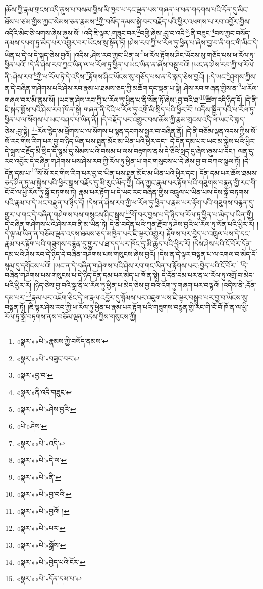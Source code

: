 །ཆོས་ཀྱི་རྣམ་གྲངས་འདི་ནུས་པ་བསམ་གྱིས་མི་ཁྱབ་པ་དང་ལྡན་པས་གཞན་ལ་ཕན་གདགས་པའི་དོན་དུ་མིང་ཐོས་པ་ཙམ་གྱིས་ཀྱང་སེམས་ཅན་རྣམས་\footnote{«སྣར་»«པེ་»རྣམས་ཀྱི་བསོད་ནམས་}ཀྱི་བསོད་ནམས་སྐྱེ་བར་བརྗོད་པའི་ཕྱིར་འཕགས་པ་རབ་འབྱོར་གྱིས་འདིའི་མིང་ཅི་ལགས་ཞེས་ཞུས་སོ། །འདི་ཇི་ལྟར་:གཟུང་བར་\footnote{«སྣར་»«པེ་»བཟུང་བར་}བགྱི་ཞེས་:བྱ་བ་འདི་\footnote{«སྣར་»བྱ་བ་}:ནི་བཟུང་\footnote{«སྣར་»ནི་འདི་གཟུང་}བས་ཀྱང་བསོད་ནམས་དཔག་ཏུ་མེད་པར་འགྱུར་བར་ཡོངས་སུ་སྟོན་ཏོ། །ཤེས་རབ་ཀྱི་ཕ་རོལ་ཏུ་ཕྱིན་པ་ཞེས་བྱ་བ་ནི་གང་གི་མིང་དེ་ཡིན་པ་དེ་ལ་དེ་སྐད་ཅེས་བྱའོ། །འདིས་:ཤེས་རབ་ཀྱང་ཡིན་ལ་\footnote{«སྣར་»«པེ་»ཤེས་བྱའི་}ཕ་རོལ་རྟོགས་ཤིང་ཡོངས་སུ་གཅོད་པས་ཕ་རོལ་ཏུ་ཕྱིན་པའོ། །དེ་ནི་ཤེས་རབ་ཀྱང་ཡིན་ལ་ཕ་རོལ་ཏུ་ཕྱིན་པ་ཡང་ཡིན་ན་ཞེས་བསྡུ་བའོ། །ཡང་ན་ཤེས་རབ་ཀྱི་ཕ་རོལ་ནི་:ཤེས་རབ་\footnote{«པེ་»ཤེས་}ཀྱི་ཕ་རོལ་ཏེ་དེ་འདིས་\footnote{«སྣར་»«པེ་»འདི་}རྟོགས་ཤིང་ཡོངས་སུ་གཅོད་པས་ན་དེ་སྐད་ཅེས་བྱའོ། །:དེ་ཡང་\footnote{«སྣར་»«པེ་»དེ་ལ་}ཤུགས་ཀྱིས་ན་དེ་བཞིན་གཤེགས་པའི་ཤེས་རབ་རྣམ་པ་ཐམས་ཅད་ཀྱི་མཆོག་དང་ལྡན་པ་སྟེ། ཤེས་རབ་གཞན་གྱིས་ན་\footnote{«སྣར་»«པེ་»ནི་}ཕ་རོལ་གཞལ་བར་མི་ནུས་སོ། །ཡང་ན་ཤེས་རབ་ཀྱི་ཕ་རོལ་ཏུ་ཕྱིན་པ་ནི་སོན་ཏོ་ཞེས་:བྱ་བའི་ཐ་\footnote{«སྣར་»«པེ་»བྱ་བའི་}ཚིག་འདི་ཉིད་དོ། །དེ་ནི་ཇི་སྐད་སྨོས་པའི་ཤེས་རབ་ཁོ་ན་སྟེ། གཞན་ནི་དེའི་ཕ་རོལ་ཏུ་འགྲོ་མི་སྲིད་པའི་ཕྱིར་རོ། །འདིས་སྦྱིན་པའི་ཕ་རོལ་ཏུ་ཕྱིན་པ་ལ་སོགས་པ་ཡང་བཤད་པ་ཡིན་ནོ། །དེ་བརྗོད་པར་འགྱུར་བས་ཆོས་ཀྱི་རྣམ་གྲངས་འདི་ལ་ཡང་དེ་སྐད་ཅེས་:བྱ་སྟེ། \footnote{«སྣར་»«པེ་»བྱའོ། ། }རོལ་རྙེད་མ་ཕྲོགས་པ་ལ་སོགས་པ་སྙན་དངགས་སྦྱར་བ་བཞིན་ནོ། །དེ་ནི་བཅོམ་ལྡན་འདས་ཀྱིས་སོ་སོ་རང་གིས་རིག་པར་བྱ་བ་ཉིད་ཡིན་པས་ཐུན་མོང་མ་ཡིན་པའི་ཕྱིར་དང་། དེ་དོན་དམ་པར་ཡང་མ་སྐྱེས་པའི་ཕྱིར་དེ་སྒྲས་བརྗོད་མི་སྲིད་དོ་སྙམ་དུ་སེམས་པའི་བསམ་པ་ལས་བརྟགས་ནས་དེ་ཅིའི་སླད་དུ་ཞེས་ཞུས་པ་དང་། ལན་དུ་རབ་འབྱོར་དེ་བཞིན་གཤེགས་པས་ཤེས་རབ་ཀྱི་རོལ་ཏུ་ཕྱིན་པ་གང་གསུངས་པ་དེ་ཞེས་བྱ་བ་བཀའ་སྩལ་ཏོ། །དེ་དོན་དམ་པ་\footnote{«སྣར་»«པེ་»པར་}སོ་སོ་རང་གིས་རིག་པར་བྱ་བ་ཡིན་པས་ཐུན་མོང་མ་ཡིན་པའི་ཕྱིར་དང་། དོན་དམ་པར་ཆོས་ཐམས་ཅད་ཤིན་ཏུ་མ་སྐྱེས་པའི་ཕྱིར་སྒྲས་བརྗོད་དུ་མི་རུང་མོད་ཀྱི། འོན་ཀྱང་རྣམ་པར་རྟོག་པའི་གཟུགས་བརྙན་གྱི་རང་གི་ངོ་བོ་ལ་ཕྱི་རོལ་ཏུ་སྒྲོ་བཏགས་ཏེ། རྣམ་པར་རྟོག་པ་དེ་ཡང་རང་བཞིན་གྱིས་འཁྲུལ་པ་ཡིན་པས་དེས་སྒྲོ་བཏགས་པའི་རྣམ་པ་དེ་ཡང་བརྫུན་པ་ཉིད་དོ། །དེས་ན་ཤེས་རབ་ཀྱི་ཕ་རོལ་ཏུ་ཕྱིན་པ་རྣམ་པར་རྟོག་པའི་གཟུགས་བརྙན་དུ་གྱུར་པ་གང་དེ་བཞིན་གཤེགས་པས་གསུངས་ཤིང་སྒྲས་\footnote{«སྣར་»«པེ་»སྒྲོས་}གོ་བར་བྱས་པ་དེ་ཉིད་ཕ་རོལ་ཏུ་ཕྱིན་པ་མེད་པ་ཡིན་གྱི། དེ་བཞིན་གཤེགས་པའི་ཤེས་རབ་ནི་མ་ཡིན་ཏེ། དེ་ནི་བདེན་པའི་ཀུན་རྫོབ་ཏུ་ཤེས་བྱའི་ཕ་རོལ་ཏུ་སོན་པའི་ཕྱིར་རོ། །དེ་ལྟ་མ་ཡིན་ན་བཅོམ་ལྡན་འདས་ཐམས་ཅད་མཁྱེན་པར་ཇི་ལྟར་འགྱུར། རྟོགས་པར་བྱེད་པ་འཁྲུལ་པས་དེ་དང་རྣམ་པར་རྟོག་པའི་གཟུགས་བརྙན་དུ་གྱུར་པ་ཐ་དད་པར་ཁོང་དུ་མི་ཆུད་པའི་ཕྱིར་རོ། །དེས་ཤེས་པའི་ངོ་བོར་དོན་དམ་པའི་ཤེས་རབ་དེ་ཉིད་དེ་བཞིན་གཤེགས་པས་གསུངས་ཞེས་བྱའོ། །དེས་ན་དེ་ལྟར་བསྟན་པ་ལ་འགལ་བ་མེད་དོ་སྙམ་དུ་དགོངས་པའོ། །ཡང་ན་དེ་བཞིན་གཤེགས་པའི་ཤེས་རབ་གང་ཡིན་པ་རྟོགས་པར་:བྱེད་པའི་ངོ་བོར་\footnote{«སྣར་»«པེ་»བྱེད་པའི་ངོར་}དེ་བཞིན་གཤེགས་པས་གསུངས་པ་དེ་ཉིད་དོན་དམ་པར་མེད་པ་ཁོ་ན་སྟེ། དེ་དོན་དམ་པར་ན་ཕ་རོལ་ཏུ་འགྲོ་བ་མེད་པའི་ཕྱིར་རོ། །ཉིད་ཅེས་བྱ་བའི་སྒྲ་ནི་ཕ་རོལ་ཏུ་ཕྱིན་པ་མེད་ཅེས་བྱ་བའི་འོག་ཏུ་གཞག་པར་བལྟའོ། །འདིས་ནི་:དོན་དམ་པར་\footnote{«སྣར་»«པེ་»དོན་དམ་པ་}རྣམ་པར་འཇོག་ཅིང་དེ་ལ་རྣལ་འབྱོར་དུ་སྙོམས་པར་འཇུག་པས་ཇི་ལྟར་བསྒྲུབ་པར་བྱ་བ་ཡོངས་སུ་བསྟན་ཏོ། །ཇི་ལྟར་ཤེས་རབ་ཀྱི་ཕ་རོལ་ཏུ་ཕྱིན་པ་རྣམ་པར་རྟོག་པའི་གཟུགས་བརྙན་གྱི་རང་གི་ངོ་བོ་ཁོ་ན་ལ་ཕྱི་རོལ་ཏུ་སྒྲོ་བཏགས་ནས་བཅོམ་ལྡན་འདས་ཀྱིས་གསུངས་ཀྱི། 